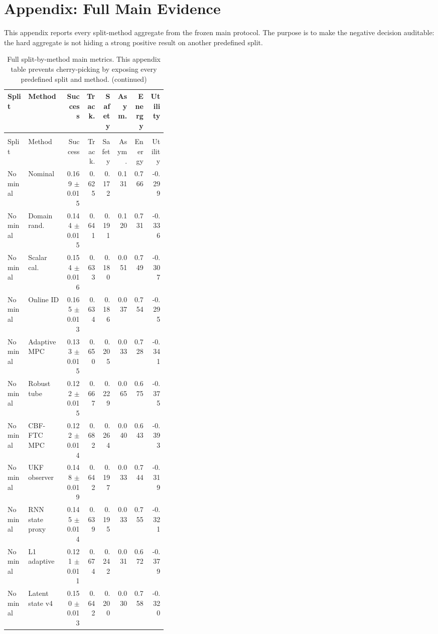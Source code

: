 \documentclass{article}
\begin{document}
\section{Appendix: Full Main Evidence}
This appendix reports every split-method aggregate from the frozen main protocol. The purpose is to make the negative decision auditable: the hard aggregate is not hiding a strong positive result on another predefined split.
\begin{center}
\tiny
\begin{longtable}{p{0.13\linewidth}p{0.24\linewidth}rrrrrr}
\caption{Full split-by-method main metrics. This appendix table prevents cherry-picking by exposing every predefined split and method.}\label{tab:full-main}\\
\toprule
Split & Method & Success & Track. & Safety & Asym. & Energy & Utility\\
\midrule
\endfirsthead
\caption[]{Full split-by-method main metrics. This appendix table prevents cherry-picking by exposing every predefined split and method. (continued)}\\
\toprule
Split & Method & Success & Track. & Safety & Asym. & Energy & Utility\\
\midrule
\endhead
Nominal & Nominal & 0.169 $\pm$ 0.015 & 0.625 & 0.172 & 0.131 & 0.766 & -0.299\\
Nominal & Domain rand. & 0.144 $\pm$ 0.015 & 0.641 & 0.191 & 0.120 & 0.731 & -0.336\\
Nominal & Scalar cal. & 0.154 $\pm$ 0.016 & 0.633 & 0.180 & 0.051 & 0.749 & -0.307\\
Nominal & Online ID & 0.165 $\pm$ 0.013 & 0.634 & 0.186 & 0.037 & 0.754 & -0.295\\
Nominal & Adaptive MPC & 0.133 $\pm$ 0.015 & 0.650 & 0.205 & 0.033 & 0.728 & -0.341\\
Nominal & Robust tube & 0.122 $\pm$ 0.015 & 0.667 & 0.229 & 0.065 & 0.675 & -0.375\\
Nominal & CBF-FTC MPC & 0.122 $\pm$ 0.014 & 0.682 & 0.264 & 0.040 & 0.643 & -0.393\\
Nominal & UKF observer & 0.148 $\pm$ 0.019 & 0.642 & 0.197 & 0.033 & 0.744 & -0.319\\
Nominal & RNN state proxy & 0.145 $\pm$ 0.014 & 0.639 & 0.195 & 0.033 & 0.755 & -0.321\\
Nominal & L1 adaptive & 0.121 $\pm$ 0.011 & 0.674 & 0.242 & 0.031 & 0.672 & -0.379\\
Nominal & Latent state v4 & 0.150 $\pm$ 0.013 & 0.642 & 0.200 & 0.030 & 0.758 & -0.320\\

\end{longtable}
\end{center}
\end{document}
